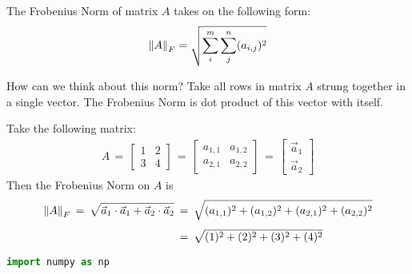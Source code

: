 \begin{definition}
    The Frobenius Norm of matrix $A$ takes on the following form:
    \begin{align*}
        \left\lVert A\right\rVert_{F} = \sqrt{\sum_{i}^{m}\sum_{j}^{n}(a_{i,j})^{2}}
    \end{align*}
\end{definition}

How can we think about this norm? Take all rows in matrix $A$ strung together in a single vector. The Frobenius Norm is dot product of this vector with itself. 

\begin{example}
Take the following matrix:
    \begin{align*}
        A \hspace{2pt} = \hspace{2pt}
        \begin{bmatrix}
            1 & 2\\
            3 & 4
        \end{bmatrix} \hspace{2pt} = \hspace{2pt} 
        \begin{bmatrix}
            a_{1,1} & a_{1,2}\\
            a_{2,1} & a_{2,2}
        \end{bmatrix} \hspace{2pt} = \hspace{2pt} 
        \begin{bmatrix}
            \vec{a}_{1}\\
            \vec{a}_{2}
        \end{bmatrix}
    \end{align*}
Then the Frobenius Norm on $A$ is 
    \begin{align*}
        \left\lVert A\right\rVert_{F} \hspace{2pt} = \hspace{2pt} \sqrt{\vec{a}_{1} \cdot \vec{a}_{1} + \vec{a}_{2} \cdot \vec{a}_{2}} \hspace{2pt} &= \hspace{2pt} \sqrt{(a_{1,1})^{2} + (a_{1,2})^{2} + (a_{2,1})^{2} + (a_{2,2})^{2}}\\[1ex]
        &= \hspace{2pt} \sqrt{(1)^{2} + (2)^{2} + (3)^{2} + (4)^{2}}
    \end{align*}

    \begin{tcolorbox}[sharp corners, colback=black!5!white, colframe=black!75!black, fontupper=\color{black}]
        \begin{lstlisting}[language=python, gobble = 12]
            import numpy as np


\end{lstlisting}
\end{tcolorbox}
\end{example}
